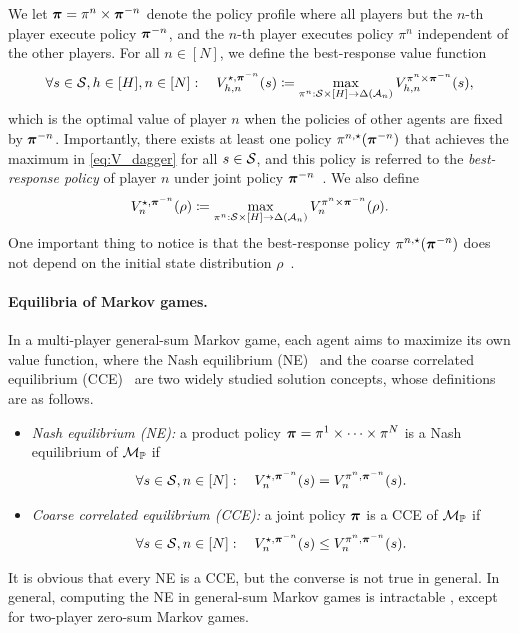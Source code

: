 We let ${\bm{\pi}}=\pi^n\times{\bm{\pi}}^{-n}$ denote the policy profile where all players but the $n$-th player execute policy ${\bm{\pi}}^{-n}$, and the $n$-th player executes policy $\pi^n$ independent of the other players. For all $n\in[N]$, we define the best-response value function
\begin{align}\label{eq:V_dagger}
    \forall s\in{\mathcal{S}},h\in[H],n\in[N]:\quad V_{h,n}^{\star,{\bm{\pi}}^{-n}}(s)\coloneqq \max_{\pi^n:{\mathcal{S}}\times[H]\rightarrow\Delta({\mathcal{A}}_n)} V_{h,n}^{\pi^n\times{\bm{\pi}}^{-n}}(s),
\end{align}
which is the optimal value of player $n$ when the policies of other agents are fixed by ${\bm{\pi}}^{-n}$.
Importantly, there exists at least one policy $\pi^{n,\star}({\bm{\pi}}^{-n})$ that achieves the maximum in \eqref{eq:V_dagger} for all $s\in{\mathcal{S}}$, and this policy is referred to the \textit{best-response policy} of player $n$ under joint policy ${\bm{\pi}}^{-n}$~\citep{shapley1953stochastic}.
 We also define 
 $$V_n^{\star,{\bm{\pi}}^{-n}}(\rho)\coloneqq \max_{\pi^n:{\mathcal{S}}\times[H]\rightarrow\Delta({\mathcal{A}}_n)} V_n^{\pi^n\times{\bm{\pi}}^{-n}}(\rho).$$
One important thing to notice is that the best-response policy $\pi^{n,\star}({\bm{\pi}}^{-n})$ does not depend on the initial state distribution $\rho$~\citep{mei2020global}.

\paragraph{Equilibria of Markov games.} In a multi-player general-sum Markov game, each agent aims to maximize its own value function, where the Nash equilibrium (NE)~\citep{nash1950non} and the coarse correlated equilibrium (CCE)~\citep{aumann1987correlated} are two widely studied solution concepts, whose definitions are as follows.
\begin{itemize}
    \item \textit{Nash equilibrium (NE):} a product policy ${\bm{\pi}}=\pi^1\times\cdots\times\pi^N$ is a Nash equilibrium of ${\mathcal{M}}_{\mathbb P}$ if
    \begin{align}\label{eq:def_NE}
            \forall s\in{\mathcal{S}}, n\in[N]:\quad V_n^{\star,{\bm{\pi}}^{-n}}(s)=V_n^{\pi^n,{\bm{\pi}}^{-n}}(s).
    \end{align}
    \item \textit{Coarse correlated equilibrium (CCE):} a joint policy ${\bm{\pi}}$ is a CCE of ${\mathcal{M}}_{\mathbb P}$ if
    \begin{align}\label{eq:def_CCE}
            \forall s\in{\mathcal{S}}, n\in[N]:\quad V_n^{\star,{\bm{\pi}}^{-n}}(s)\leq V_n^{\pi^n,{\bm{\pi}}^{-n}}(s).
    \end{align}
\end{itemize}
It is obvious that every NE is a CCE, but the converse is not true in general. In general, computing the NE in general-sum Markov games is intractable \citep{daskalakis2009complexity}, except for two-player zero-sum Markov games. 



